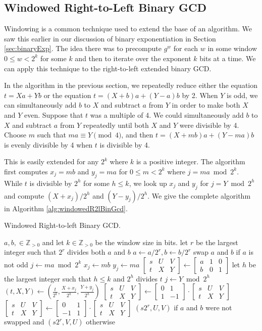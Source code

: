 \documentclass{ucalgthes1}
\theoremstyle{definition}
\newcommand{\ZZgtz}{\mathbb{Z}_{>0}}
\newcommand{\matrixtt}[4]{\left[ \begin{array}{rr} #1 & #2 \\ #3 & #4 \end{array} \right]}
\newcommand{\matrixThreeTwo}[6]{\left[ \begin{array}{rrr} #1 & #2 & #3 \\ #4 & #5 & #6 \end{array} \right]}
\begin{document}
\subsection{Windowed Right-to-Left Binary GCD}

Windowing is a common technique used to extend the base of an algorithm.  We saw this earlier in our discussion of binary exponentiation in Section \ref{sec:binaryExp}.  The idea there was to precompute $g^w$ for each $w$ in some window $0 \le w < 2^k$ for some $k$ and then to iterate over the exponent $k$ bits at a time.  We can apply this technique to the right-to-left extended binary GCD.

In the algorithm in the previous section, we repeatedly reduce either the equation $t=Xa+Yb$ or the equation $t=(X+b)a+(Y-a)b$ by 2. When $Y$ is odd, we can simultaneously add $b$ to $X$ and subtract $a$ from $Y$ in order to make both $X$ and $Y$ even.  Suppose that $t$ was a multiple of 4.  We could simultaneously add $b$ to $X$ and subtract $a$ from $Y$ repeatedly until both $X$ and $Y$ were divisible by 4.  Choose $m$ such that $ma \equiv Y \pmod 4$, and then $t = (X+mb)a + (Y-ma)b$ is evenly divisible by 4 when $t$ is divisible by 4.

This is easily extended for any $2^k$ where $k$ is a positive integer.  The algorithm first computes $x_j = mb$ and $y_j = ma$ for $0 \le m < 2^k$ where $j = ma \bmod 2^k$.  While $t$ is divisible by $2^h$ for some $h \le k$, we look up $x_j$ and $y_j$ for $j = Y \bmod 2^h$ and compute $(X + x_j) / 2^h$ and $(Y - y_j) / 2^h$.  We give the complete algorithm in Algorithm \ref{alg:windowedR2lBinGcd}.

\begin{algorithm}[h]
\caption{Windowed Right-to-left Binary GCD.}
\label{alg:windowedR2lBinGcd}
\begin{algorithmic}[1]
\REQUIRE $a,b, \in \ZZgtz$ and let $k \in \ZZgtz$ be the window size in bits.
\STATE let $r$ be the largest integer such that $2^r$ divides both $a$ and $b$
\STATE $a \gets a / 2^r, b \gets b / 2^r$
\STATE swap $a$ and $b$ if $a$ is not odd
	\STATE $j \gets ma \bmod 2^k$
	\STATE $x_j \gets mb$
	\STATE $y_j \gets ma$
\ENDFOR
\STATE $\matrixThreeTwo{s}{U}{V}{t}{X}{Y} \gets \matrixThreeTwo{a}{1}{0}{b}{0}{1}$
		\STATE let $h$ be the largest integer such that $h \le k$ and $2^h$ divides $t$
		\STATE $j \gets Y \bmod 2^h$
		\STATE $(t, X, Y) \gets \left( \frac{t}{2^k}, \frac{X+x_j}{2^h}, \frac{Y+y_j}{2^h} \right)$  
	\ENDWHILE
		\STATE $\matrixThreeTwo{s}{U}{V}{t}{X}{Y} \gets \matrixtt{0}{1}{1}{-1} \cdot \matrixThreeTwo{s}{U}{V}{t}{X}{Y}$
	\ELSE
		\STATE $\matrixThreeTwo{s}{U}{V}{t}{X}{Y} \gets \matrixtt{0}{1}{-1}{1} \cdot \matrixThreeTwo{s}{U}{V}{t}{X}{Y}$
	\ENDIF
\ENDWHILE
\RETURN $(s2^r, U, V)$ if $a$ and $b$ were not swapped and $(s2^r, V, U)$ otherwise
\end{algorithmic}
\end{algorithm}
\end{document}

